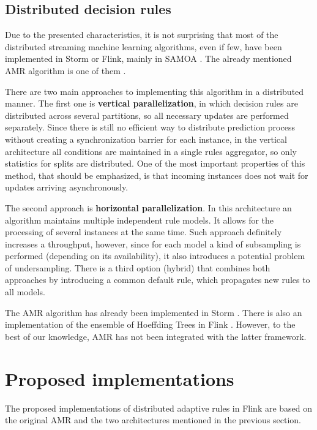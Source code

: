 \documentclass[journal]{IEEEtran}
\begin{document}
\subsection{Distributed decision rules}
Due to the presented characteristics, it is not surprising that most of the distributed streaming machine learning algorithms, even if few, have been implemented in Storm or Flink, mainly in SAMOA \cite{Morales:2013}. The already mentioned AMR algorithm is one of them \cite{Vu:2014}. 

There are two main approaches to implementing this algorithm in a distributed manner. The first one is \textbf{vertical parallelization}, in which decision rules are distributed across several partitions, so all necessary updates are performed separately. Since there is still no efficient way to distribute prediction process without creating a synchronization barrier for each instance, in the vertical architecture all conditions are maintained in a single rules aggregator, so only statistics for splits are distributed. One of the most important properties of this method, that should be emphasized, is that incoming instances does not wait for updates arriving asynchronously.

The second approach is \textbf{horizontal parallelization}. In this architecture an algorithm maintains multiple independent rule models. It allows for the processing of several instances at the same time. Such approach definitely increases a throughput, however, since for each model a kind of subsampling is performed (depending on its availability), it also introduces a potential problem of undersampling. There is a third option (hybrid) that combines both approaches by introducing a common default rule, which propagates new rules to all models.

The AMR algorithm has already been implemented in Storm \cite{Vu:2014}. There is also an implementation of the ensemble of Hoeffding Trees in Flink \cite{Vasiloudis:2017}. However, to the best of our knowledge, AMR has not been integrated with the latter framework.

\section{Proposed implementations}

The proposed implementations of distributed adaptive rules in Flink are based on the original AMR and the two architectures mentioned in the previous section.
\end{document}
